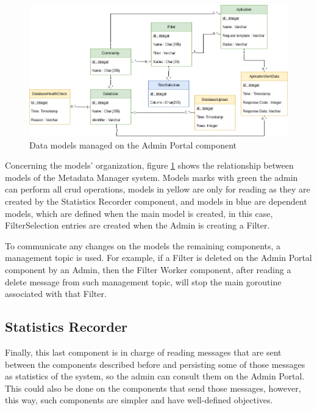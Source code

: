 \begin{figure}[H]
    \center
    \includegraphics[width=\textwidth]{data-models}
    \caption{Data models managed on the Admin Portal component}
    \label{fig:data-models}
\end{figure}

Concerning the models' organization, figure \ref{fig:data-models} shows the relationship between models of the Metadata Manager system.
Models marks with green the admin can perform all \gls{crud} operations, models in yellow are only for reading as they are created by the Statistics Recorder component, and models in blue are dependent models, which are defined when the main model is created, in this case, FilterSelection entries are created when the Admin is creating a Filter.

To communicate any changes on the models the remaining components, a management topic is used.
For example, if a Filter is deleted on the Admin Portal component by an Admin, then the Filter Worker component, after reading a delete message from such management topic, will stop the main goroutine associated with that Filter.

\subsection{Statistics Recorder}

Finally, this last component is in charge of reading messages that are sent between the components described before and persisting some of those messages as statistics of the system, so the admin can consult them on the Admin Portal.
This could also be done on the components that send those messages, however, this way, such components are simpler and have well-defined objectives.

